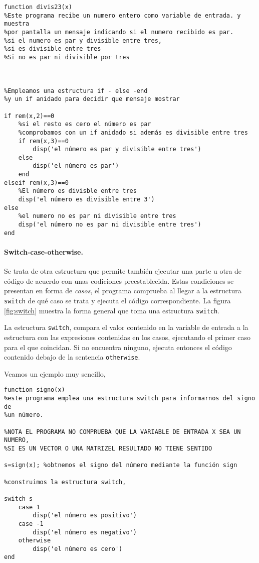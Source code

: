 \begin{verbatim}
function divis23(x)
%Este programa recibe un numero entero como variable de entrada. y muestra
%por pantalla un mensaje indicando si el numero recibido es par. 
%si el numero es par y divisible entre tres,
%si es divisible entre tres  
%Si no es par ni divisible por tres 



%Empleamos una estructura if - else -end 
%y un if anidado para decidir que mensaje mostrar

if rem(x,2)==0
    %si el resto es cero el número es par
    %comprobamos con un if anidado si además es divisible entre tres
    if rem(x,3)==0
        disp('el número es par y divisible entre tres')
    else
        disp('el número es par')
    end
elseif rem(x,3)==0
    %El número es divisble entre tres
    disp('el número es divisible entre 3')
else
    %el numero no es par ni divisible entre tres
    disp('el número no es par ni divisible entre tres')
end
\end{verbatim}

\paragraph{Switch-case-otherwise.} Se trata de otra estructura que permite también ejecutar una parte u otra de código de acuerdo con unas codiciones preestablecida. Estas condiciones se presentan en forma de \emph{casos}, el programa comprueba al llegar a la estructura \texttt{switch} de qué caso se trata y ejecuta el código correspondiente. La figura \ref{fig:switch} muestra la forma general que toma una estructura \texttt{switch}.

La estructura \texttt{switch}, compara el valor contenido en la variable de entrada a la estructura con las expresiones contenidas en los casos, ejecutando el primer caso para el que coincidan. Si no encuentra ninguno, ejecuta entonces el código contenido debajo de la sentencia \texttt{otherwise}.

Veamos un ejemplo muy sencillo,

\begin{verbatim}
function signo(x)
%este programa emplea una estructura switch para informarnos del signo de
%un número.

%NOTA EL PROGRAMA NO COMPRUEBA QUE LA VARIABLE DE ENTRADA X SEA UN NUMERO,
%SI ES UN VECTOR O UNA MATRIZEL RESULTADO NO TIENE SENTIDO
  
s=sign(x); %obtnemos el signo del número mediante la función sign

%construimos la estructura switch,

switch s
    case 1
        disp('el número es positivo')
    case -1
        disp('el número es negativo')
    otherwise
        disp('el número es cero')
end

\end{verbatim}

